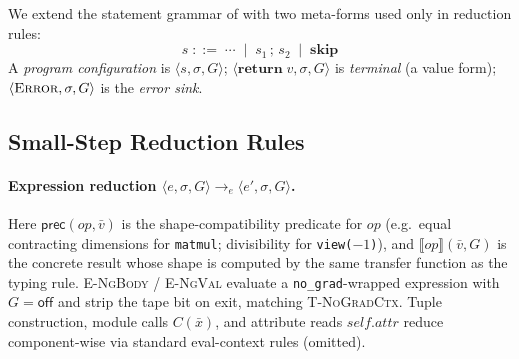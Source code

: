 We extend the statement grammar of  with two meta-forms used
only in reduction rules:
\[
  s \;::=\; \cdots \;\mid\; s_1\,;\,s_2 \;\mid\; \mathbf{skip}
\]
A \emph{program configuration} is $\langle s,\sigma,G\rangle$;
$\langle\mathbf{return}\;v,\sigma,G\rangle$ is \emph{terminal}
(a value form); $\langle\textsc{Error},\sigma,G\rangle$ is the
\emph{error sink}.

\subsection{Small-Step Reduction Rules}
\label{app:sos-rules}

\paragraph{Expression reduction
  $\langle e,\sigma,G\rangle\to_e\langle e',\sigma,G\rangle$.}

{\small
{}}

\noindent
Here $\mathsf{prec}(\mathit{op},\bar v)$ is the shape-compatibility predicate
for $\mathit{op}$ (e.g.\ equal contracting dimensions for \texttt{matmul};
divisibility for \texttt{view($-1$)}), and $\llbracket\mathit{op}\rrbracket(\bar v,G)$
is the concrete result whose shape is computed by the same transfer function as
the typing rule.
\textsc{E-NgBody} / \textsc{E-NgVal} evaluate a \texttt{no\_grad}-wrapped
expression with $G=\mathsf{off}$ and strip the tape bit on exit, matching
\textsc{T-NoGradCtx}.
Tuple construction, module calls $C(\bar x)$, and attribute reads
$\mathit{self}.\mathit{attr}$ reduce component-wise via standard eval-context
rules (omitted).

